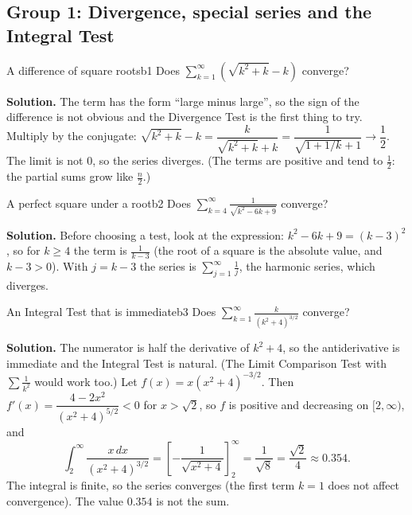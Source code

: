 \documentclass[11pt]{article}
\begin{document}
\subsection*{Group 1: Divergence, special series and the Integral Test}

\begin{exmp}{A difference of square roots}{b1}
Does $\displaystyle\sum_{k=1}^\infty\left(\sqrt{k^2+k}-k\right)$ converge?

\textbf{Solution.} The term has the form ``large minus large'', so the sign of the difference is not obvious and the Divergence Test is the first thing to try. Multiply by the conjugate: $\sqrt{k^2+k}-k=\dfrac{k}{\sqrt{k^2+k}+k}=\dfrac1{\sqrt{1+1/k}+1}\to\dfrac12$. The limit is not $0$, so the series diverges. (The terms are positive and tend to $\frac12$: the partial sums grow like $\frac n2$.)
\end{exmp}

\begin{exmp}{A perfect square under a root}{b2}
Does $\displaystyle\sum_{k=4}^\infty\frac1{\sqrt{k^2-6k+9}}$ converge?

\textbf{Solution.} Before choosing a test, look at the expression: $k^2-6k+9=(k-3)^2$, so for $k\ge4$ the term is $\frac1{k-3}$ (the root of a square is the absolute value, and $k-3>0$). With $j=k-3$ the series is $\sum_{j=1}^\infty\frac1j$, the harmonic series, which diverges.
\end{exmp}

\begin{exmp}{An Integral Test that is immediate}{b3}
Does $\displaystyle\sum_{k=1}^\infty\frac{k}{(k^2+4)^{3/2}}$ converge?

\textbf{Solution.} The numerator is half the derivative of $k^2+4$, so the antiderivative is immediate and the Integral Test is natural. (The Limit Comparison Test with $\sum\frac1{k^2}$ would work too.) Let $f(x)=x(x^2+4)^{-3/2}$. Then $f'(x)=\dfrac{4-2x^2}{(x^2+4)^{5/2}}<0$ for $x>\sqrt2$, so $f$ is positive and decreasing on $[2,\infty)$, and
\[
\int_2^\infty\frac{x\,dx}{(x^2+4)^{3/2}}=\left[-\frac1{\sqrt{x^2+4}}\right]_2^\infty=\frac1{\sqrt8}=\frac{\sqrt2}4\approx0.354 .
\]
The integral is finite, so the series converges (the first term $k=1$ does not affect convergence). The value $0.354$ is not the sum.
\end{exmp}
\end{document}
